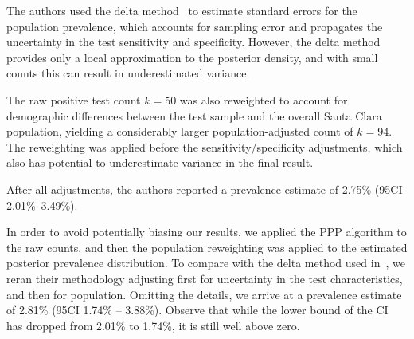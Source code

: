 \documentclass[dvipdfmx]{article}
\begin{document}
The authors used the delta method~\cite{delta_1992} to estimate
standard errors for the population prevalence, which accounts for
sampling error and propagates the uncertainty in the test sensitivity
and specificity. However, the delta method provides only a local
approximation to the posterior density, and with small counts this can
result in underestimated variance.

The raw positive test count $k=50$ was also reweighted to account for
demographic differences between the test sample and the overall Santa
Clara population, yielding a considerably larger population-adjusted
count of $k=94$.  The reweighting was applied before the
sensitivity/specificity adjustments, which also has potential to
underestimate variance in the final result.

After all adjustments, the authors reported a prevalence estimate of
2.75\% (95CI 2.01\%--3.49\%).

In order to avoid potentially biasing our results, we applied the PPP
algorithm to the raw counts, and then the population reweighting was
applied to the estimated posterior prevalence distribution. To compare
with the delta method used in~\cite{Bendavid2020.04.14.20062463}, we
reran their methodology adjusting first for uncertainty in the test
characteristics, and then for population. Omitting the details, we
arrive at a prevalence estimate of 2.81\% (95CI 1.74\% --
3.88\%). Observe that while the lower bound of the CI has dropped from
2.01\% to 1.74\%, it is still well above zero.
\end{document}
